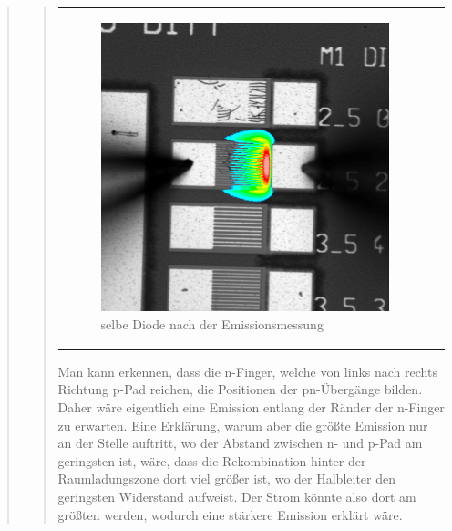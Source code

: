 \begin{quote}
\begin{quote}
\begin{center}
\begin{tabular}{ll}
\begin{minipage}{0.6\textwidth}
                    \end{minipage}
                    \begin{minipage}{0.6\textwidth}

                         \begin{figure}[H]
                            \label{fig:zttrzttz}
                            \includegraphics[scale=0.25, trim = 0cm 0cm 0cm
                            0cm,
                            clip]{./Emissionsbilder/fuenf/SuperImpose.png}
                            \caption{selbe Diode nach der Emissionsmessung}
                        \end{figure}
                   \vspace{-1.5em}

                    \end{minipage}

                \end{tabular}
                \end{center}

        \vspace{2em}

        Man kann erkennen, dass die n-Finger, welche von links nach rechts
        Richtung p-Pad reichen, die Positionen der pn-Übergänge bilden. Daher
        wäre eigentlich eine Emission entlang der Ränder der n-Finger zu erwarten.
        Eine Erklärung, warum aber die größte Emission nur an der Stelle
        auftritt, wo der Abstand zwischen n- und p-Pad am geringsten ist, wäre, dass die
        Rekombination hinter der Raumladungszone dort viel größer ist, wo der
        Halbleiter den geringsten Widerstand aufweist. Der Strom könnte also
        dort am größten werden, wodurch eine stärkere Emission erklärt wäre.


\end{quote}
\end{quote}
